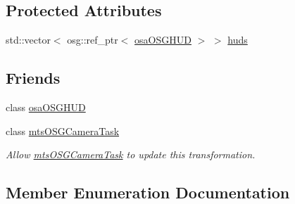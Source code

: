\subsection*{Protected Attributes}
\begin{DoxyCompactItemize}
\item 
std\+::vector$<$ osg\+::ref\+\_\+ptr$<$ \hyperlink{classosa_o_s_g_h_u_d}{osa\+O\+S\+G\+H\+U\+D} $>$ $>$ \hyperlink{classosa_o_s_g_camera_a237022117dad9914d09ca392c455448b}{huds}
\end{DoxyCompactItemize}
\subsection*{Friends}
\begin{DoxyCompactItemize}
\item 
class \hyperlink{classosa_o_s_g_camera_a558e1c2494d52ebb0ac01ac496c5e888}{osa\+O\+S\+G\+H\+U\+D}
\item 
class \hyperlink{classosa_o_s_g_camera_a7f45bb9ad9fefaf19bb707da99c35df7}{mts\+O\+S\+G\+Camera\+Task}
\begin{DoxyCompactList}\small\item\em Allow \hyperlink{classmts_o_s_g_camera_task}{mts\+O\+S\+G\+Camera\+Task} to update this transformation. \end{DoxyCompactList}\end{DoxyCompactItemize}


\subsection{Member Enumeration Documentation}
\hypertarget{classosa_o_s_g_camera_ad52eea10482129213b72fc2c49cd47de}{}

